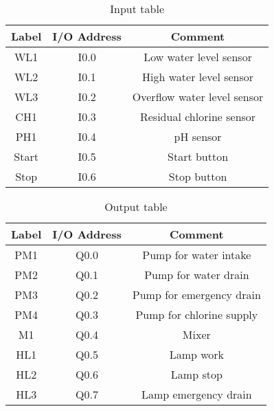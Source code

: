 \begin{table}[]
    \centering
    \begin{tabular}{|c|c|c|}
    \hline
       Label & I/O Address & Comment \\
       \hline
       WL1 & I0.0 & Low water level sensor\\
       \hline
       WL2 & I0.1 & High water level sensor\\
       \hline
       WL3 & I0.2 & Overflow water level sensor\\
       \hline
       CH1 & I0.3 & Residual chlorine sensor\\
       \hline
       PH1 & I0.4 & pH sensor\\
       \hline
       Start & I0.5 & Start button\\
       \hline
       Stop & I0.6 & Stop button\\
       \hline
    \end{tabular}
    \caption{Input table}
    \label{tab:input_table}
\end{table}

\begin{table}[]
    \centering
    \begin{tabular}{|c|c|c|}
    \hline
       Label & I/O Address & Comment \\
       \hline
       PM1 & Q0.0 & Pump for water intake\\
       \hline
       PM2 & Q0.1 & Pump for water drain\\
       \hline
       PM3 & Q0.2 & Pump for emergency drain\\
       \hline
       PM4 & Q0.3 & Pump for chlorine supply\\
       \hline
       M1 & Q0.4 & Mixer\\
       \hline
       HL1 & Q0.5 & Lamp work\\
       \hline
       HL2 & Q0.6 & Lamp stop\\
       \hline
       HL3 & Q0.7 & Lamp emergency drain\\
       \hline
    \end{tabular}
    \caption{Output table}
    \label{tab:output_label}
\end{table}

